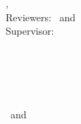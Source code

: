 \hfill
\vfill
{
	\small
	\textbf{\thesisName} \\
	\textit{\thesisTitle} \\
	\thesisSubject, \thesisDate \\
	Reviewers: \thesisFirstReviewer\ and \thesisSecondReviewer \\
	Supervisor: \thesisFirstSupervisor \\[1.5em]
	\textbf{\thesisUniversity} \\
	\textit{\thesisUniversityGroup} \\
	\thesisUniversityInstitute \\
	\thesisUniversityDepartment \\
	\thesisUniversityStreetAddress \\
	\thesisUniversityPostalCode\ and \thesisUniversityCity
}
